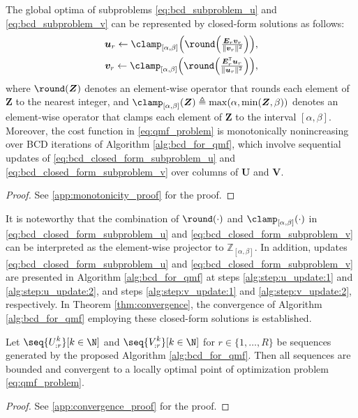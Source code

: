 \begin{theorem}[Monotonicity] \label{the:bcd_subproblem}
    The global optima of subproblems \eqref{eq:bcd_subproblem_u} and \eqref{eq:bcd_subproblem_v} can be represented by closed-form solutions as follows:
    \begin{align}
        \textstyle \bm{u}_r \gets \clamp_{[\alpha,\beta]}\Big(\round\Big(\frac{\bm{E}_r \bm{v}_r}{\lVert \bm{v}_r \rVert^2}\Big)\Big), \label{eq:bcd_closed_form_subproblem_u} \\
        \textstyle \bm{v}_r \gets \clamp_{[\alpha,\beta]}\Big(\round\Big(\frac{\bm{E}_r^\mathsf{T} \bm{u}_r}{\lVert \bm{u}_r \rVert^2}\Big)\Big),
        \label{eq:bcd_closed_form_subproblem_v}
    \end{align}
    where $\round(\bm{Z})$ denotes an element-wise operator that rounds each element of $\bm{Z}$ to the nearest integer, and $\clamp_{[\alpha,\beta]}(\bm{Z}) \triangleq \max(\alpha, \min(\bm{Z}, \beta))$ denotes an element-wise operator that clamps each element of $\bm{Z}$ to the interval $[\alpha,\beta]$. Moreover, the cost function in \eqref{eq:qmf_problem} is monotonically nonincreasing over BCD iterations of Algorithm \ref{alg:bcd_for_qmf}, which involve sequential updates of \eqref{eq:bcd_closed_form_subproblem_u} and \eqref{eq:bcd_closed_form_subproblem_v} over columns of $\bm U$ and $\bm V$.
\end{theorem}
\begin{proof}
    See \ref{app:monotonicity_proof} for the proof.
\end{proof}

It is noteworthy that the combination of $\round(\cdot)$ and $\clamp_{[\alpha,\beta]}(\cdot)$ in \eqref{eq:bcd_closed_form_subproblem_u} and \eqref{eq:bcd_closed_form_subproblem_v} can be interpreted as the element-wise projector to $\mathbb{Z}_{[\alpha,\beta]}$. In addition, updates \eqref{eq:bcd_closed_form_subproblem_u} and \eqref{eq:bcd_closed_form_subproblem_v} are presented in Algorithm \ref{alg:bcd_for_qmf} at steps \ref{alg:step:u_update:1} and \ref{alg:step:u_update:2}, and steps \ref{alg:step:v_update:1} and \ref{alg:step:v_update:2}, respectively. In Theorem \ref{thm:convergence}, the convergence of Algorithm \ref{alg:bcd_for_qmf} employing these closed-form solutions is established.

\begin{theorem}[Convergence]\label{thm:convergence}
    Let $\seq{\displaystyle U_{:r}^{k}}[k\in\N]$ and $\seq{\displaystyle V_{:r}^{k}}[k\in\N]$ for $r\in \{1,\dots,R\}$ be sequences generated by the proposed Algorithm \ref{alg:bcd_for_qmf}. Then all sequences are bounded and convergent to a locally optimal point of optimization problem \eqref{eq:qmf_problem}.
\end{theorem}
\begin{proof}
    See \ref{app:convergence_proof} for the proof.
\end{proof}

